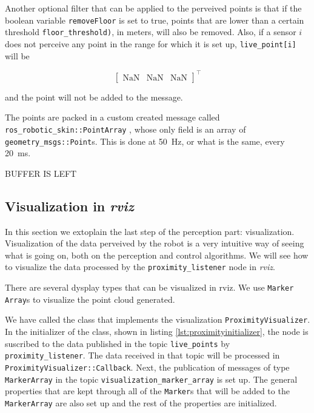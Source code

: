 Another optional filter that can be applied to the perveived points is that if the boolean variable \lstinline{removeFloor} is set to true, points that are lower than a certain threshold \lstinline{floor_threshold)}, in meters, will also be removed. Also, if a sensor $i$ does not perceive any point in the range for which it is set up, \lstinline{live_point[i]} will be

$$
\begin{bmatrix}
\text{NaN} & \text{NaN} & \text{NaN}
\end{bmatrix}
^{\intercal}
$$

and the point will not be added to the message.

The points are packed in a custom created message called \lstinline{ros_robotic_skin::PointArray} , whose only field is an array of \lstinline{geometry_msgs::Point}s. This is done at \SI{50}{\hertz}, or what is the same, every \SI{20}{\milli \second}.

BUFFER IS LEFT

\subsection{Visualization in \textit{rviz}}
\label{ss:visualization}

In this section we extoplain the last step of the perception part: visualization. Visualization of the data perveived by the robot is a very intuitive way of seeing what is going on, both on the perception and control algorithms. We will see how to visualize the data processed by the \lstinline{proximity_listener} node in \textit{rviz}.

There are several dysplay types that can be visualized in rviz. We use \lstinline{Marker Array}s \cite{rvizmarker} to visualize the point cloud generated.

We have called the class that implements the visualization \lstinline{ProximityVisualizer}. In the initializer of the class, shown in listing \ref{lst:proximityinitializer}, the node is suscribed  to the data published in the topic \lstinline{live_points} by \lstinline{proximity_listener}. The data received in that topic will be processed in \lstinline{ProximityVisualizer::Callback}. Next, the publication of messages of type \lstinline{MarkerArray} in the topic \lstinline{visualization_marker_array} is set up. The general properties that are kept through all of the \lstinline{Marker}s that will be added to the \lstinline{MarkerArray} are also set up and the rest of the properties are initialized.

